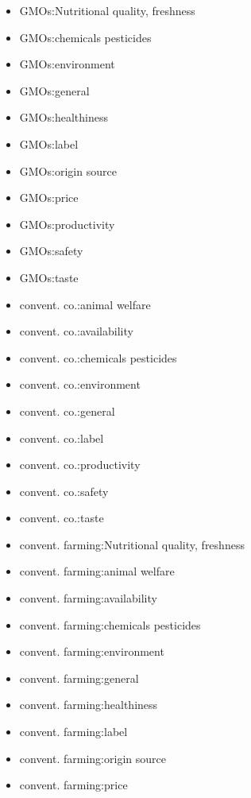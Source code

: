 \begin{multicols}{2}
    \begin{itemize}[leftmargin=*]
        \setlength\itemsep{-0.5em}

        \item[] GMOs:Nutritional quality, freshness 
        \item[] GMOs:chemicals pesticides 
        \item[] GMOs:environment
        \item[] GMOs:general
        \item[] GMOs:healthiness
        \item[] GMOs:label 
        \item[] GMOs:origin source 
        \item[] GMOs:price 
        \item[] GMOs:productivity 
        \item[] GMOs:safety
        \item[] GMOs:taste 
        \item[] convent. co.:animal welfare 
        \item[] convent. co.:availability
        \item[] convent. co.:chemicals pesticides
        \item[] convent. co.:environment 
        \item[] convent. co.:general 
        \item[] convent. co.:label
        \item[] convent. co.:productivity
        \item[] convent. co.:safety 
        \item[] convent. co.:taste
        \item[] convent. farming:Nutritional quality, freshness 
        \item[] convent. farming:animal welfare
        \item[] convent. farming:availability 
        \item[] convent. farming:chemicals pesticides 
        \item[] convent. farming:environment
        \item[] convent. farming:general
        \item[] convent. farming:healthiness
        \item[] convent. farming:label 
        \item[] convent. farming:origin source 
        \item[] convent. farming:price 

\end{itemize}
\end{multicols}
